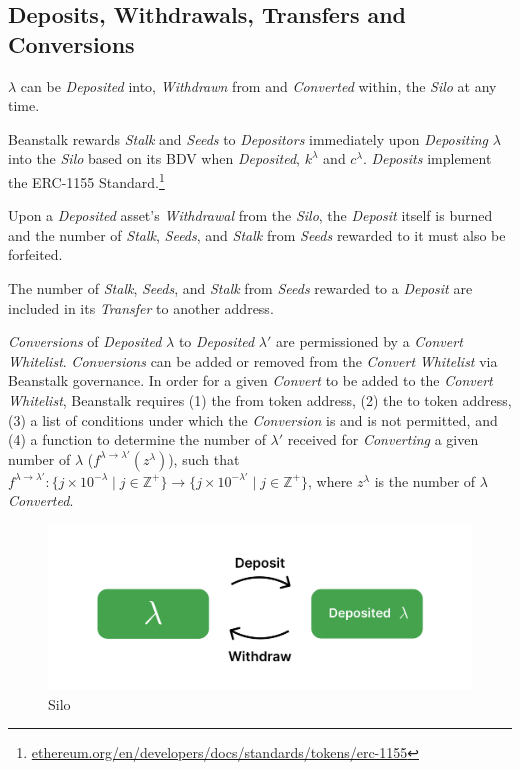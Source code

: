 \documentclass[tikz]{article}
\newcommand{\term}[1]{\textsl{#1}}
\newcommand{\fref}[1]{\footnote{\href{http://#1}{#1}}}
\begin{document}
\vspace*{-1mm}
\subsection{Deposits, Withdrawals, Transfers and Conversions}
\vspace*{-1mm}
\hyperlink{ht126}{$\lambda$} can be \term{Deposited} into, \term{Withdrawn} from and \term{Converted} within, the \term{Silo} at any time.

Beanstalk rewards \term{Stalk} and \term{Seeds} to \term{Depositors} immediately upon \term{Depositing} \hyperlink{ht126}{$\lambda$} into the \term{Silo} based on its BDV when \term{Deposited}, \hyperlink{ht120}{$k^{\lambda}$} and \hyperlink{ht32}{$c^{\lambda}$}. \term{Deposits} implement the ERC-1155 Standard.\fref{ethereum.org/en/developers/docs/standards/tokens/erc-1155}

Upon a \term{Deposited} asset's \term{Withdrawal} from the \term{Silo}, the \term{Deposit} itself is burned and the number of \term{Stalk}, \term{Seeds}, and \term{Stalk} from \term{Seeds} rewarded to it must also be forfeited. 

The number of \term{Stalk}, \term{Seeds}, and \term{Stalk} from \term{Seeds} rewarded to a \term{Deposit} are included in its \term{Transfer} to another address.

\term{Conversions} of \term{Deposited} \hyperlink{ht126}{$\lambda$} to \term{Deposited} $\lambda'$ are permissioned by a \term{Convert} \term{Whitelist}. \term{Conversions} can be added or removed from the \term{Convert} \term{Whitelist} via Beanstalk governance. In order for a given \term{Convert} to be added to the \term{Convert} \term{Whitelist}, Beanstalk requires (1) the from token address, (2) the to token address, (3) a list of conditions under which the \term{Conversion} is and is not permitted, and (4) a function to determine the number of $\lambda'$ received for \term{Converting} a given number of \hyperlink{ht126}{$\lambda$} ($f^{\lambda \rightarrow \lambda'}(z^{\lambda})$), such that $f^{\lambda \rightarrow \lambda'}\colon \{j \times 10^{-\lambda} \mid j \in \mathbb{Z}^{+} \} \rightarrow \{j \times 10^{-\lambda'} \mid j \in \mathbb{Z}^{+} \}$, where $z^{\lambda}$ is the number of \hyperlink{ht126}{\hyperlink{ht126}{$\lambda$}} \term{Converted}. 

\begin{figure}[h!]
    \centering
    \includegraphics[scale=.16]{Figure1}
    \vspace*{-5mm}
    \caption{Silo}
    \label{fig 1}
\end{figure}
\end{document}
